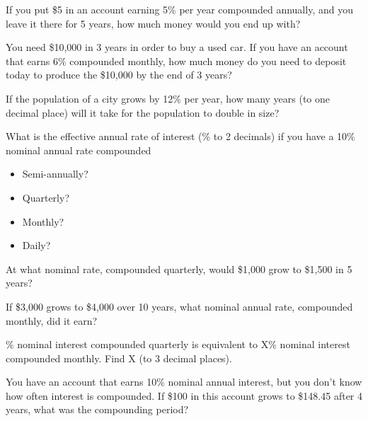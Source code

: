 \documentclass[12pt]{exam}
\begin{document}
\begin{questions}

    \question If you put \$5 in an account earning 5\% per year compounded annually, and you leave it
    there for 5 years, how much money would you end up with?
    \vspace{1.5in}

    \question You need \$10,000 in 3 years in order to buy a used car. If you have an account
    that earns 6\% compounded monthly, how much money do you need to deposit today to
    produce the \$10,000 by the end of 3 years?
    \vspace{1.5in}

    \question If the population of a city grows by 12\% per year, how many years (to one decimal place) will it take for
    the population to double in size?
    \vspace{1.5in}

    \question What is the effective annual rate of interest (\% to 2 decimals) if you have a 10\% nominal annual
    rate compounded
    \begin{itemize}
        \item Semi-annually?
        \item Quarterly?
        \item Monthly?
        \item Daily?
    \end{itemize}
    \vspace{2in}

    \question At what nominal rate, compounded quarterly, would \$1,000 grow to \$1,500 in 5 years?
    \vspace{2in}

    \question If \$3,000 grows to \$4,000 over 10 years, what nominal annual rate, compounded
    monthly, did it earn?
    \vspace{2in}

    \% nominal interest compounded quarterly is equivalent to X\% nominal interest
    compounded monthly. Find X (to 3 decimal places).
    \vspace{2in}

    \question You have an account that earns 10\% nominal annual interest, but you don’t know how
    often interest is compounded. If \$100 in this account grows to \$148.45 after 4 years, what
    was the compounding period?
    \vspace{1.5in}

\end{questions}
\end{document}
